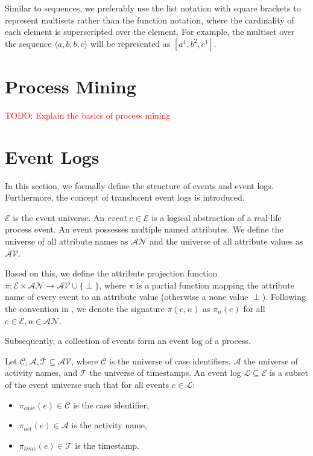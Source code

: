 Similar to sequences, we preferably use the list notation with square brackets to represent multisets rather than the function notation, where the cardinality of each element is superscripted over the element. For example, the multiset over the sequence $\langle a, b, b, c \rangle$ will be represented as $[a^1, b^2, c^1]$.

\section{Process Mining}

\textcolor{red}{TODO: Explain the basics of process mining}

\section{Event Logs}

In this section, we formally define the structure of events and event logs. Furthermore, the concept of translucent event logs is introduced.

\begin{definition}[Event]
    $\mathcal{E}$ is the event universe. An \emph{event} $e \in \mathcal{E}$ is a logical abstraction of a real-life process event. An event possesses multiple named attributes. We define the universe of all attribute names as $\mathcal{AN}$ and the universe of all attribute values as $\mathcal{AV}$.  
\end{definition}

Based on this, we define the attribute projection function $\pi \colon \mathcal{E} \times \mathcal{AN} \rightarrow \mathcal{AV} \cup \{ \perp \}$, where $\pi$ is a partial function mapping the attribute name of every event to an attribute value (otherwise a none value $\perp$). Following the convention in \cite{bible}, we denote the signature $\pi(e, n)$ as $\pi_n(e)$ for all $e \in \mathcal{E}, n \in \mathcal{AN}$.

Subsequently, a collection of events form an event log of a process.

\begin{definition}
    Let $\mathcal{C, A, T} \subseteq \mathcal{AV}$, where $\mathcal{C}$ is the universe of case identifiers, $\mathcal{A}$ the universe of activity names, and $\mathcal{T}$ the universe of timestamps.  An event log $\mathcal{L} \subseteq \mathcal{E}$ is a subset of the event universe such that for all events $e \in \mathcal{L}$:
    
    \begin{itemize}
        \item $\pi_{case}(e) \in \mathcal{C}$ is the case identifier,
        \item $\pi_{act}(e) \in \mathcal{A}$ is the activity name,
        \item $\pi_{time}(e) \in \mathcal{T}$ is the timestamp.
    \end{itemize}
\end{definition}

